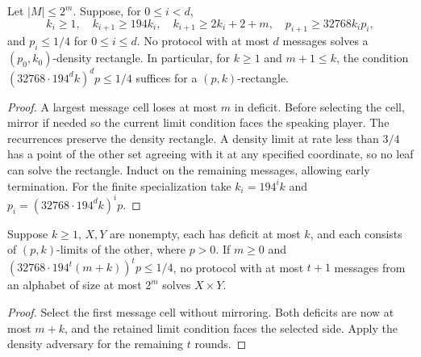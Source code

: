 \begin{theorem}
  \label{thm:lowerbounds-density-adversary}
  \leanok
  Let $|M|\le2^m$. Suppose, for $0\le i<d$,
  \[
    k_i\ge1,\quad k_{i+1}\ge194k_i,\quad
    k_{i+1}\ge2k_i+2+m,\quad p_{i+1}\ge32768k_ip_i,
  \]
  and $p_i\le1/4$ for $0\le i\le d$. No protocol with at most $d$
  messages solves a $(p_0,k_0)$-density rectangle.
  In particular, for $k\ge1$ and $m+1\le k$, the condition
  $(32768\cdot194^d k)^d p\le1/4$ suffices for a $(p,k)$-rectangle.
\end{theorem}
\begin{proof}
  \leanok
  A largest message cell loses at most $m$ in deficit. Before selecting
  the cell, mirror if needed so the current limit condition faces the
  speaking player. The recurrences preserve the density rectangle.
  A density limit at rate less than $3/4$ has a point of the other set
  agreeing with it at any specified coordinate, so no leaf can solve
  the rectangle. Induct on the remaining messages, allowing early
  termination. For the finite specialization take
  $k_i=194^ik$ and $p_i=(32768\cdot194^d k)^i p$.
\end{proof}

\begin{lemma}
  \label{lem:lowerbounds-bilateral-adversary}
  \leanok
  Suppose $k\ge1$, $X,Y$ are nonempty, each has deficit at most $k$, and
  each consists of $(p,k)$-limits of the other, where $p>0$. If $m\ge0$ and
  $(32768\cdot194^t(m+k))^t p\le1/4$, no protocol with at most $t+1$
  messages from an alphabet of size at most $2^m$ solves $X\times Y$.
\end{lemma}
\begin{proof}
  \leanok
  Select the first message cell without mirroring. Both deficits are
  now at most $m+k$, and the retained limit condition faces the selected
  side. Apply the density adversary for the remaining $t$ rounds.
\end{proof}

